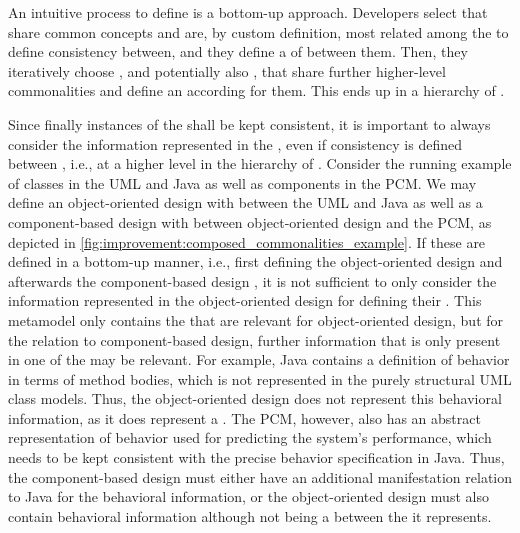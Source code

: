 An intuitive process to define \commonalities is a bottom-up approach.
Developers select \concretemetamodels that share common concepts and are, by custom definition, most related among the \concretemetamodels to define consistency between, and they define a \conceptmetamodel of \commonalities between them.
Then, they iteratively choose \conceptmetamodels, and potentially also \concretemetamodels, that share further higher-level commonalities and define an according \conceptmetamodel for them.
This ends up in a hierarchy of \conceptmetamodels.

Since finally instances of the \concretemetamodels shall be kept consistent, it is important to always consider the information represented in the \concretemetamodels, even if consistency is defined between \conceptmetamodels, i.e., at a higher level in the hierarchy of \conceptmetamodels.
Consider the running example of classes in the \gls{UML} and Java as well as components in the \gls{PCM}.
We may define an object-oriented design \conceptmetamodel with \commonalities between the \gls{UML} and Java as well as a component-based design \conceptmetamodel with \commonalities between object-oriented design and the \gls{PCM}, as depicted in \autoref{fig:improvement:composed_commonalities_example}.
If these \conceptmetamodels are defined in a bottom-up manner, i.e., first defining the object-oriented design \conceptmetamodel and afterwards the component-based design \conceptmetamodels, it is not sufficient to only consider the information represented in the object-oriented design \conceptmetamodels for defining their \commonalities.
This metamodel only contains the \commonalities that are relevant for object-oriented design, but for the relation to component-based design, further information that is only present in one of the \concretemetamodels may be relevant.
For example, Java contains a definition of behavior in terms of method bodies, which is not represented in the purely structural \gls{UML} class models.
Thus, the object-oriented design \conceptmetamodel does not represent this behavioral information, as it does represent a \commonality.
The \gls{PCM}, however, also has an abstract representation of behavior used for predicting the system's performance, which needs to be kept consistent with the precise behavior specification in Java.
Thus, the component-based design \conceptmetamodel must either have an additional manifestation relation to Java for the behavioral information, or the object-oriented design \conceptmetamodel must also contain behavioral information although not being a \commonality between the \concretemetamodels it represents.

